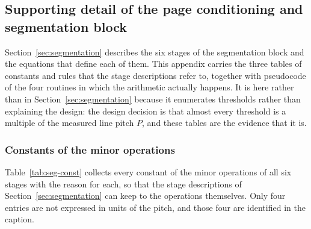 
\subsection{Supporting detail of the page conditioning and segmentation block}
\label{sec:app-seg}

Section~\ref{sec:segmentation} describes the six stages of the segmentation block and the equations that define each of them.
This appendix carries the three tables of constants and rules that the stage descriptions refer to, together with pseudocode of the four routines in which the arithmetic actually happens.
It is here rather than in Section~\ref{sec:segmentation} because it enumerates thresholds rather than explaining the design: the design decision is that almost every threshold is a multiple of the measured line pitch $P$, and these tables are the evidence that it is.

\subsubsection{Constants of the minor operations}

Table~\ref{tab:seg-const} collects every constant of the minor operations of all six stages with the reason for each, so that the stage descriptions of Section~\ref{sec:segmentation} can keep to the operations themselves.
Only four entries are not expressed in units of the pitch, and those four are identified in the caption.


